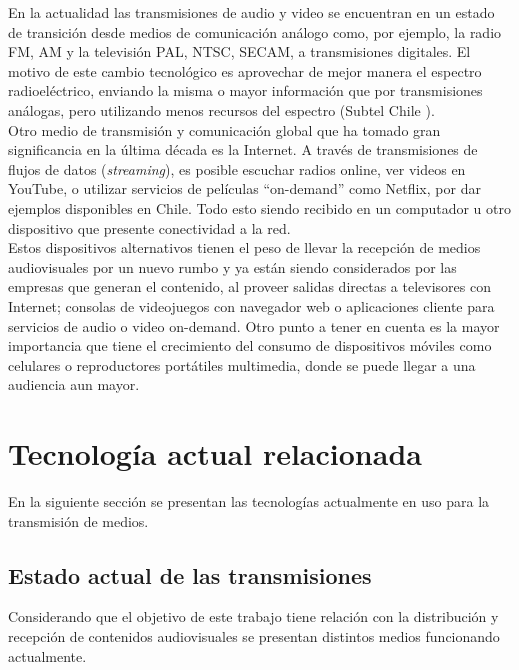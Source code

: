 En la actualidad las transmisiones de audio y video se encuentran en un estado de transición desde medios de comunicación análogo como, por ejemplo, la radio FM, AM y la televisión PAL, NTSC, SECAM, a transmisiones digitales. El motivo de este cambio tecnológico es aprovechar de mejor manera el espectro radioeléctrico, enviando la misma o mayor información que por transmisiones análogas, pero utilizando menos recursos del espectro (Subtel Chile \cite{sota:subtel}).\\

Otro medio de transmisión y comunicación global que ha tomado gran significancia en la última década es la Internet. A través de transmisiones de flujos de datos (\textit{streaming}), es posible escuchar radios online, ver videos en YouTube, o utilizar servicios de películas “on-demand” como Netflix, por dar ejemplos disponibles en Chile. Todo esto siendo recibido en un computador u otro dispositivo que presente conectividad a la red.\\

Estos dispositivos alternativos tienen el peso de llevar la recepción de medios audiovisuales por un nuevo rumbo y ya están siendo considerados por las empresas que generan el contenido, al proveer salidas directas a televisores con Internet; consolas de videojuegos con navegador web o aplicaciones cliente para servicios de audio o video on-demand. Otro punto a tener en cuenta es la mayor importancia que tiene el crecimiento del consumo de dispositivos móviles como celulares o reproductores portátiles multimedia, donde se puede llegar a una audiencia aun mayor.\\

\clearpage
\section{Tecnología actual relacionada}
En la siguiente sección se presentan las tecnologías actualmente en uso para la transmisión de medios.

\subsection{Estado actual de las transmisiones}

Considerando que el objetivo de este trabajo tiene relación con la distribución y recepción de contenidos audiovisuales se presentan distintos medios funcionando actualmente.\\

